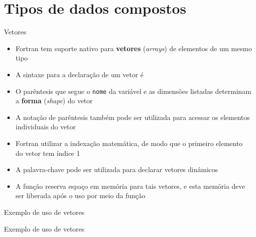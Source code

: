 \section{Tipos de dados compostos}

\begin{frame}[fragile]{Vetores}

    \begin{itemize}
        \item Fortran tem suporte nativo para \textbf{vetores} (\textit{arrays}) de elementos de 
            um mesmo tipo

        \item A sintaxe para a declaração de um vetor é 


        \item O parêntesis que segue o \texttt{nome} da variável e as dimensões listadas
            determinam a \textbf{forma} (\textit{shape}) do vetor

        \item A notação de parêntesis também pode ser utilizada para acessar os elementos
            individuais do vetor

        \item Fortran utilizar a indexação matemática, de modo que o primeiro elemento do vetor
            tem índice 1

        \item A palavra-chave  pode ser utilizada para declarar
            vetores dinâmicos

        \item A função  reserva espaço em memória para tais vetores, e
            esta memória deve ser liberada após o uso por meio da função 

    \end{itemize}

\end{frame}

\begin{frame}[fragile]{Exemplo de uso de vetores}
\end{frame}

\begin{frame}[fragile]{Exemplo de uso de vetores}
\end{frame}

